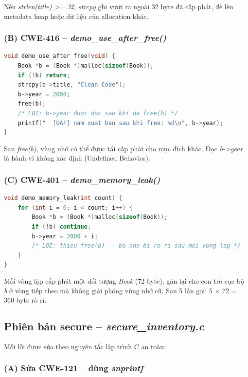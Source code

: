 Nếu \textit{strlen(title) >= 32}, \textit{strcpy} ghi vượt ra ngoài 32 byte đã
cấp phát, đè lên metadata heap hoặc dữ liệu của allocation khác.

\subsubsection{(B) CWE-416 -- \textit{demo\_use\_after\_free()}}

\begin{lstlisting}[language=C, caption={Lỗi CWE-416: truy cập con trỏ sau free()}]
void demo_use_after_free(void) {
    Book *b = (Book *)malloc(sizeof(Book));
    if (!b) return;
    strcpy(b->title, "Clean Code");
    b->year = 2008;
    free(b);
    /* LOI: b->year duoc doc sau khi da free(b) */
    printf("  [UAF] nam xuat ban sau khi free: %d\n", b->year);
}
\end{lstlisting}

Sau \textit{free(b)}, vùng nhớ có thể được tái cấp phát cho mục đích khác. Đọc
\textit{b->year} là hành vi không xác định (Undefined Behavior).

\subsubsection{(C) CWE-401 -- \textit{demo\_memory\_leak()}}

\begin{lstlisting}[language=C, caption={Lỗi CWE-401: vòng lặp cấp phát thiếu free()}]
void demo_memory_leak(int count) {
    for (int i = 0; i < count; i++) {
        Book *b = (Book *)malloc(sizeof(Book));
        if (!b) continue;
        b->year = 2000 + i;
        /* LOI: thieu free(b) -- bo nho bi ro ri sau moi vong lap */
    }
}
\end{lstlisting}

Mỗi vòng lặp cấp phát một đối tượng \textit{Book} (72 byte), gán lại cho con
trỏ cục bộ \textit{b} ở vòng tiếp theo mà không giải phóng vùng nhớ cũ.
Sau 5 lần gọi: 5 $\times$ 72 = 360 byte rò rỉ.

\subsection{Phiên bản secure -- \textit{secure\_inventory.c}}

Mỗi lỗi được sửa theo nguyên tắc lập trình C an toàn:

\subsubsection{(A) Sửa CWE-121 -- dùng \textit{snprintf}}

